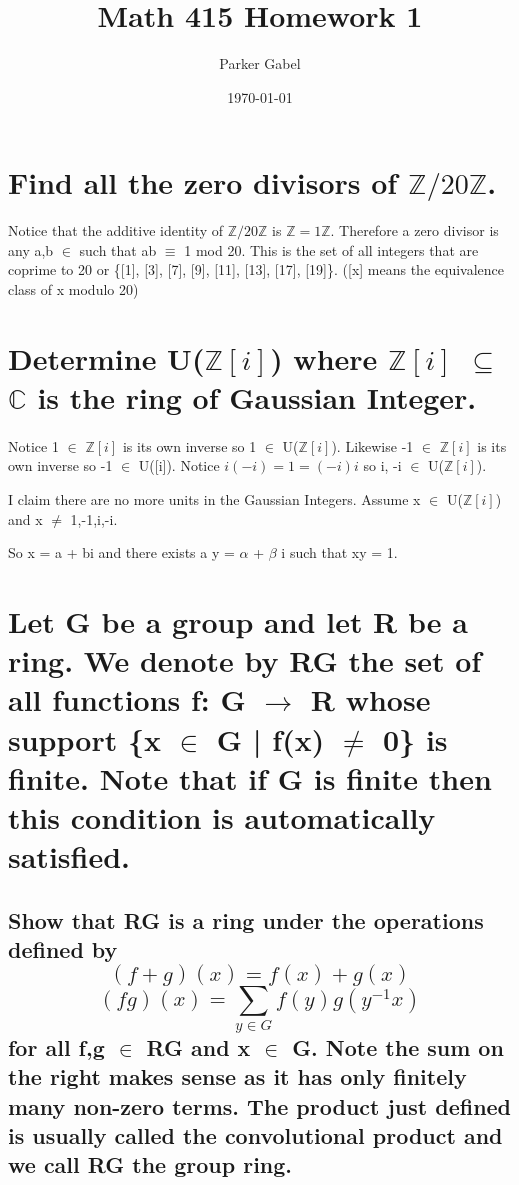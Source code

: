 \documentclass[11pt]{article}
\author{Parker Gabel}
\date{\today}
\title{Math 415 Homework 1}
\begin{document}
\maketitle

\section{Find all the zero divisors of \(\mathbb{Z}/20\mathbb{Z}\).}
\label{sec:orgfcafc88}
Notice that the additive identity of \(\mathbb{Z}/20\mathbb{Z}\) is \(\mathbb{Z} = 1 \mathbb{Z}\). 
Therefore a zero divisor is any a,b \(\in\)  such that ab \(\equiv\) 1 mod 20. This is the set of all integers that are coprime to 20 or \{[1], [3], [7], [9], [11], [13], [17], [19]\}. ([x] means the equivalence class of x modulo 20)

\section{Determine U(\(\mathbb{Z}[i]\)) where \(\mathbb{Z}[i]\) \(\subseteq\) \(\mathbb{C}\) is the ring of Gaussian Integer.}
\label{sec:orgcd16b14}
\paragraph{}
Notice 1 \(\in\) \(\mathbb{Z}[i]\) is its own inverse so 1 \(\in\) U(\(\mathbb{Z}[i]\)). Likewise -1 \(\in\) \(\mathbb{Z}[i]\) is its own inverse so -1 \(\in\) U([i]).
Notice \(i(-i) = 1 = (-i)i\) so i, -i \(\in\) U(\(\mathbb{Z}[i]\)). \par 
I claim there are no more units in the Gaussian Integers.
Assume x \(\in\) U(\(\mathbb{Z}[i]\)) and x \(\ne\) 1,-1,i,-i. \par
So x = a + bi and there exists a y = \(\alpha\) + \(\beta\) i such that xy = 1. \par

\section{Let G be a group and let R be a ring.  We denote by RG the set of all functions f: G \(\to\) R whose support \{x \(\in\) G | f(x) \(\ne\) 0\} is finite.  Note that if G is finite then this condition is automatically satisfied.}
\label{sec:org355168e}
\subsection{Show that RG is a ring under the operations defined by \[(f+g)(x) =f(x) +g(x)\]    \[(fg)(x) =\sum_{y\in G} f(y)g(y^{-1}x) \]for all f,g \(\in\) RG and x \(\in\) G.  Note the sum on the right makes sense as it has only finitely many non-zero terms. The product just defined is usually called the convolutional product and we call RG the group ring.}
\label{sec:org0b16156}
\end{document}
